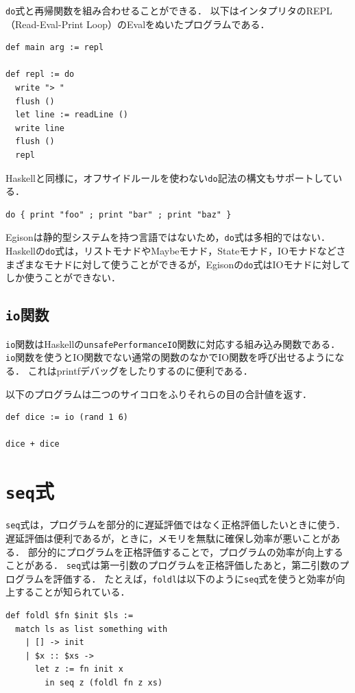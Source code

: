 \lstinline{do}式と再帰関数を組み合わせることができる．
以下はインタプリタのREPL（Read-Eval-Print Loop）のEvalをぬいたプログラムである．
\begin{lstlisting}[language=egison,numbers=none]
def main arg := repl

def repl := do
  write "> "
  flush ()
  let line := readLine ()
  write line
  flush ()
  repl
\end{lstlisting}

Haskellと同様に，オフサイドルールを使わない\lstinline{do}記法の構文もサポートしている．
\begin{lstlisting}[language=egison,numbers=none]
do { print "foo" ; print "bar" ; print "baz" }
\end{lstlisting}

Egisonは静的型システムを持つ言語ではないため，\lstinline{do}式は多相的ではない．
Haskellの\lstinline{do}式は，リストモナドやMaybeモナド，Stateモナド，IOモナドなどさまざまなモナドに対して使うことができるが，Egisonの\lstinline{do}式はIOモナドに対してしか使うことができない．

\subsection{\texttt{io}関数}

\lstinline{io}関数はHaskellの\lstinline{unsafePerformanceIO}関数に対応する組み込み関数である．
\lstinline{io}関数を使うとIO関数でない通常の関数のなかでIO関数を呼び出せるようになる．
これはprintfデバッグをしたりするのに便利である．

以下のプログラムは二つのサイコロをふりそれらの目の合計値を返す．
\begin{lstlisting}[language=egison,numbers=none]
def dice := io (rand 1 6)

dice + dice
\end{lstlisting}

\section{\texttt{seq}式}

\lstinline{seq}式は，プログラムを部分的に遅延評価ではなく正格評価したいときに使う．
遅延評価は便利であるが，ときに，メモリを無駄に確保し効率が悪いことがある．
部分的にプログラムを正格評価することで，プログラムの効率が向上することがある．
\lstinline{seq}式は第一引数のプログラムを正格評価したあと，第二引数のプログラムを評価する．
たとえば，\lstinline{foldl}は以下のように\lstinline{seq}式を使うと効率が向上することが知られている．
\begin{lstlisting}[language=egison,numbers=none]
def foldl $fn $init $ls :=
  match ls as list something with
    | [] -> init
    | $x :: $xs ->
      let z := fn init x
        in seq z (foldl fn z xs)
\end{lstlisting}
      

